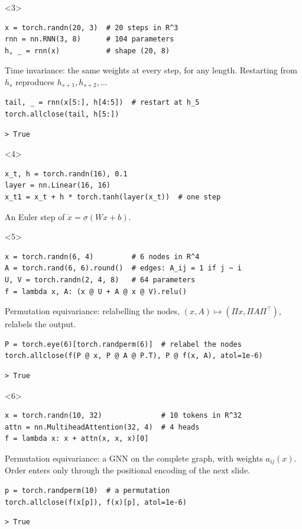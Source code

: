 \documentclass[10pt]{beamer}
\begin{document}
\begin{frame}
\begin{onlyenv}<3>
\begin{lstlisting}
x = torch.randn(20, 3)  # 20 steps in R^3
rnn = nn.RNN(3, 8)      # 104 parameters
h, _ = rnn(x)           # shape (20, 8)
\end{lstlisting}
\alert{Time invariance:} the same weights at every step, for any length. Restarting from $h_s$ reproduces $h_{s+1},h_{s+2},\dots$
\begin{lstlisting}[belowskip=2pt]
tail, _ = rnn(x[5:], h[4:5])  # restart at h_5
torch.allclose(tail, h[5:])
\end{lstlisting}
\begin{lstlisting}[style=output]
> True
\end{lstlisting}
\end{onlyenv}

\begin{onlyenv}<4>
\begin{lstlisting}
x_t, h = torch.randn(16), 0.1
layer = nn.Linear(16, 16)
x_t1 = x_t + h * torch.tanh(layer(x_t))  # one step
\end{lstlisting}
An Euler step of $\dot x=\sigma(Wx+b)$.
\end{onlyenv}

\begin{onlyenv}<5>
\begin{lstlisting}
x = torch.randn(6, 4)         # 6 nodes in R^4
A = torch.rand(6, 6).round()  # edges: A_ij = 1 if j ~ i
U, V = torch.randn(2, 4, 8)   # 64 parameters
f = lambda x, A: (x @ U + A @ x @ V).relu()
\end{lstlisting}
\alert{Permutation equivariance:} relabelling the nodes, $(x,A)\mapsto(\Pi x,\Pi A\Pi^\top)$, relabels the output.
\begin{lstlisting}[belowskip=2pt]
P = torch.eye(6)[torch.randperm(6)]  # relabel the nodes
torch.allclose(f(P @ x, P @ A @ P.T), P @ f(x, A), atol=1e-6)
\end{lstlisting}
\begin{lstlisting}[style=output]
> True
\end{lstlisting}
\end{onlyenv}

\begin{onlyenv}<6>
\begin{lstlisting}
x = torch.randn(10, 32)              # 10 tokens in R^32
attn = nn.MultiheadAttention(32, 4)  # 4 heads
f = lambda x: x + attn(x, x, x)[0]
\end{lstlisting}
\alert{Permutation equivariance:} a GNN on the complete graph, with weights $a_{ij}(x)$. Order enters only through the \alert{positional encoding} of the next slide.
\begin{lstlisting}[belowskip=2pt]
p = torch.randperm(10)  # a permutation
torch.allclose(f(x[p]), f(x)[p], atol=1e-6)
\end{lstlisting}
\begin{lstlisting}[style=output]
> True
\end{lstlisting}
\end{onlyenv}
\end{frame}
\end{document}
